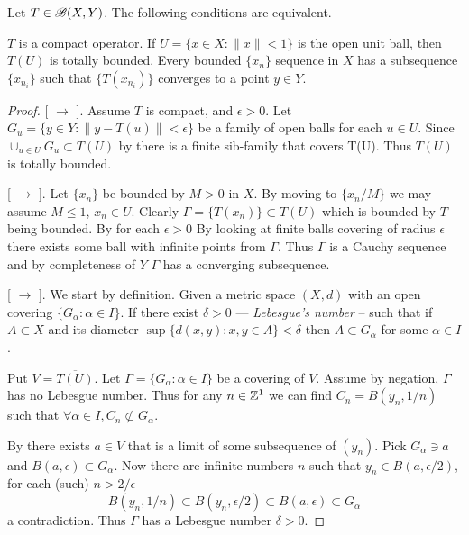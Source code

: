 \begin{llem} \label{lem:compact:op}
Let \(T\in \mathscr{B}(X,Y)\). The following conditions are equivalent.
\begin{itemize}
 $T$ is a compact operator.
 If \(U = \{x\in X: \|x\|<1\}\) is the open unit ball,
        then \(T(U)\) is totally bounded.
 Every bounded \(\{x_n\}\) sequence in $X$ has
         a subsequence \(\{x_{n_i}\}\) such that \(\{T(x_{n_i})\}\)
        converges to a point \(y\in Y\).
\end{itemize}
\end{llem}
\begin{proof}

[ \(\to\) ].
Assume $T$ is compact, and \(\epsilon>0\).
Let \(G_u = \{y\in Y: \|y - T(u)\|< \epsilon\}\) be a family
of open balls for each \(u\in U\).
Since \(\cup_{u\in U} G_u  \subset T(U)\) by  
there is a finite sib-family that covers T(U).
Thus \(T(U)\) is totally bounded.

[ \(\to\) ].
Let \(\{x_n\}\) be bounded by \(M > 0\) in $X$.
By moving to  \(\{x_n/M\}\) we may assume \(M\leq1\), \(x_n\in U\).
Clearly \(\Gamma=\{T(x_n)\}\subset T(U)\)
which is bounded by $T$ being bounded.
By  for each \(\epsilon>0\)
By looking at finite balls covering of radius \(\epsilon\)
there exists some ball with infinite points from \(\Gamma\).
Thus  \(\Gamma\) is a Cauchy sequence and by completeness of $Y$
 \(\Gamma\) has a converging subsequence.

[ \(\to\) ].
We start by definition.
Given a metric space \((X,d)\) with an open covering
\(\{G_\alpha: \alpha\in I\}\).
If there exist \(\delta>0\) 
--- \emph{Lebesgue's number}  --
such that 
if \(A\subset X\) and its diameter \(\sup \{d(x,y): x,y\in A\} < \delta\)
then  \(A \subset G_\alpha\) for some \(\alpha\in I\).

Put \(V = \overline{T(U)}\).
Let \(\Gamma=\{G_\alpha: \alpha\in I\}\) be a covering of $V$.
Assume by negation, \(\Gamma\) has no Lebesgue number.
Thus for any \(n\in\mathbb{Z}^1\) we can find \(C_n=B(y_n,1/n)\)
such that \(\forall \alpha\in I, C_n \not\subset G_\alpha\).

By  there exists \(a\in V\) that is
a limit of some subsequence of \((y_n)\).
Pick \(G_\alpha \ni a\) and \(B(a,\epsilon)\subset G_\alpha\).
Now there are infinite numbers $n$ such 
that \(y_n \in B(a,\epsilon/2)\), for each (such) \(n > 2/\epsilon\)
\begin{equation*}
B(y_n,1/n) \subset B(y_n,\epsilon/2) \subset B(a,\epsilon) \subset G_\alpha
\end{equation*}
a contradiction. Thus \(\Gamma\) has a Lebesgue number \(\delta>0\).


\end{proof}
